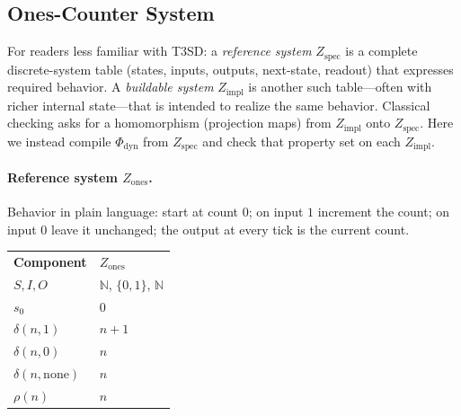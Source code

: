 \subsection{Ones-Counter System}
\label{sec:case-ones}

For readers less familiar with T3SD: a \emph{reference system} $Z_{\text{spec}}$ is a complete discrete-system table (states, inputs, outputs, next-state, readout) that expresses required behavior. A \emph{buildable system} $Z_{\text{impl}}$ is another such table---often with richer internal state---that is intended to realize the same behavior. Classical checking asks for a homomorphism (projection maps) from $Z_{\text{impl}}$ onto $Z_{\text{spec}}$. Here we instead compile $\Phi_{\mathrm{dyn}}$ from $Z_{\text{spec}}$ and check that property set on each $Z_{\text{impl}}$.

\paragraph{Reference system $Z_{\mathrm{ones}}$.}
Behavior in plain language: start at count $0$; on input $1$ increment the count; on input $0$ leave it unchanged; the output at every tick is the current count.

\begingroup
\renewcommand{\arraystretch}{1.25}
\footnotesize
\begin{center}
\begin{tabularx}{0.78\linewidth}{@{}>{\raggedright\arraybackslash}p{2.8cm}Y@{}}
    \headingfont\bfseries Component & \headingfont\bfseries $Z_{\mathrm{ones}}$ \\
    \addlinespace[2pt]
    $S,I,O$ & $\mathbb{N}$, $\{0,1\}$, $\mathbb{N}$ \\
    \addlinespace[2pt]
    $s_0$ & $0$ \\
    \addlinespace[2pt]
    $\delta(n,1)$ & $n+1$ \\
    \addlinespace[2pt]
    $\delta(n,0)$ & $n$ \\
    \addlinespace[2pt]
    $\delta(n,\mathrm{none})$ & $n$ \\
    \addlinespace[2pt]
    $\rho(n)$ & $n$ \\
\end{tabularx}
\end{center}
\label{tab:z-ones}
\endgroup
\vspace{4pt}


